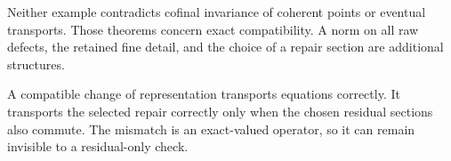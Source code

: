Neither example contradicts cofinal invariance of coherent points or eventual transports. Those theorems concern exact compatibility. A norm on all raw defects, the retained fine detail, and the choice of a repair section are additional structures.

\begin{insight}
A compatible change of representation transports equations correctly. It transports the selected repair correctly only when the chosen residual sections also commute. The mismatch is an exact-valued operator, so it can remain invisible to a residual-only check.
\end{insight}
